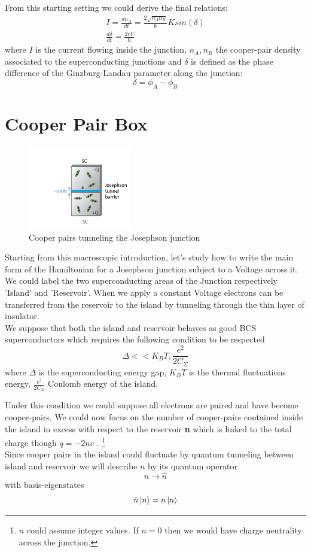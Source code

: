 From this starting setting we could derive the final relations:
\begin{gather}
     I = \frac{dn_A}{dt} = \frac{2\sqrt{n_An_B}}{\hbar} Ksin(\delta)\\
    \frac{d\delta}{dt} = \frac{2eV}{\hbar} 
\end{gather}
 where $I$ is the current flowing inside the junction, $n_A, n_B$ the cooper-pair density associated to the superconducting junctions and $\delta$ is defined as the phase difference of the Ginzburg-Landau parameter along the junction:
 \begin{equation}
     \delta = \phi_{A} - \phi_{B} 
 \end{equation} 
 
 
 
\section{Cooper Pair Box}

\begin{figure}[h]
\centering
\includegraphics[width=0.4\textwidth]{pic/transmon/jj3.png}
\caption{Cooper pairs tunneling the Josephson junction}
\end{figure}
Starting from this macroscopic introduction, let's study how to write the main form of the Hamiltonian for a Josephson junction subject to a Voltage across it.
We could label the two superconducting areas of the Junction respectively 'Island' and 'Reservoir'. When we apply a constant Voltage electrons can be transferred from the reservoir to the island by tunneling through the thin layer of insulator.\\
We suppose that both the island and reservoir behaves as good BCS superconductors which requires the following condition to be respected $$\Delta << K_BT,\frac{e^2}{2C_{\Sigma}} $$ where $\Delta$ is the superconducting energy gap, $K_BT$ is the thermal fluctuations energy, $\frac{e^2}{2C_{\Sigma}}$ Coulomb energy of the island.\\ \par 
Under this condition we could suppose all electrons are paired and have become cooper-pairs.
We could now focus on the number of cooper-pairs contained inside the island in excess with respect to the reservoir \textbf{n} which is linked to the total charge though  $q = -2ne$ . \footnote{$n$ could assume integer values. If $n = 0$ then we would have charge neutrality across the junction.}\\ 
Since cooper pairs in the island could fluctuate by quantum tunneling between island and reservoir we will describe $n$ by its quantum operator $$n \rightarrow \hat{n}$$
with basis-eigenstates 
\begin{equation}
    \hat{n}\ket{n} = n\ket{n}
\end{equation}

